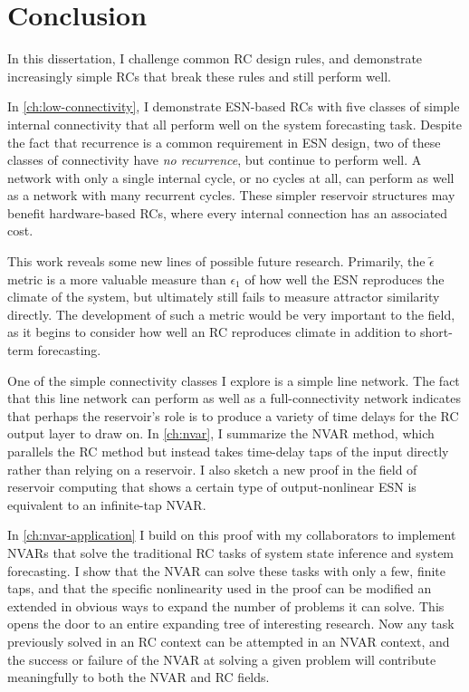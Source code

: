 \chapter{Conclusion}\label{ch:conclusion}

In this dissertation, I challenge common RC design rules, and
demonstrate increasingly simple RCs that break these rules and still
perform well.

In \cref{ch:low-connectivity}, I demonstrate ESN-based RCs with five
classes of simple internal connectivity that all perform well on the
system forecasting task. Despite the fact that recurrence is a common
requirement in ESN design, two of these classes of connectivity have
\emph{no recurrence}, but continue to perform well. A network with only a
single internal cycle, or no cycles at all, can perform as well as a
network with many recurrent cycles. These simpler reservoir structures
may benefit hardware-based RCs, where every internal connection has an
associated cost.

This work reveals some new lines of possible future
research. Primarily, the $\tilde{\epsilon}$ metric is a more valuable
measure than $\epsilon_1$ of how well the ESN reproduces the climate
of the system, but ultimately still fails to measure attractor
similarity directly. The development of such a metric would be very
important to the field, as it begins to consider how well an RC
reproduces climate in addition to short-term forecasting.

One of the simple connectivity classes I explore is a simple line
network. The fact that this line network can perform as well as a
full-connectivity network indicates that perhaps the reservoir's role
is to produce a variety of time delays for the RC output layer to draw
on. In \cref{ch:nvar}, I summarize the NVAR method, which parallels
the RC method but instead takes time-delay taps of the input directly
rather than relying on a reservoir. I also sketch a new proof in the
field of reservoir computing that shows a certain type of
output-nonlinear ESN is equivalent to an infinite-tap NVAR.

In \cref{ch:nvar-application} I build on this proof with my
collaborators to implement NVARs that solve the traditional RC tasks
of system state inference and system forecasting. I show
that the NVAR can solve these tasks with only a few, finite taps, and
that the specific nonlinearity used in the proof can be modified an
extended in obvious ways to expand the number of problems it can
solve. This opens the door to an entire expanding tree of interesting
research. Now any task previously solved in an RC context can be
attempted in an NVAR context, and the success or failure of the NVAR
at solving a given problem will contribute meaningfully to both the
NVAR and RC fields.


